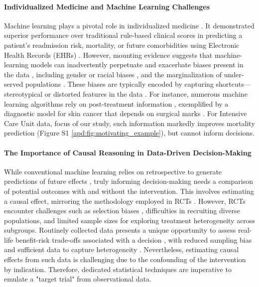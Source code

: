 \documentclass[10pt,letterpaper]{article}
\begin{document}
\paragraph{Individualized Medicine and Machine Learning Challenges}
Machine learning plays a pivotal role in individualized medicine  \cite{rajkomar2018scalable,liu2019comparison,li2020behrt,beaulieu2021machine,aggarwal2021diagnostic}. It
demonstrated superior performance over traditional rule-based clinical scores in predicting a patient's readmission risk, mortality, or future comorbidities using Electronic Health Records (EHRs) \cite{rajkomar2018scalable,liu2019comparison,li2020behrt,beaulieu2021machine,aggarwal2021diagnostic}.
However, mounting evidence suggests that machine-learning models can inadvertently perpetuate and exacerbate biases present in the data \cite{rajkomar2018ensuring}, including gender or racial biases \cite{singh2022generalizability,gichoya2022ai}, and the marginalization of under-served populations \cite{seyyed2021underdiagnosis}. These biases are typically encoded by capturing shortcuts—stereotypical or distorted features in the data \cite{geirhos2020shortcut,winkler2019association,degrave2021ai}.
%
For instance, numerous machine learning algorithms rely on post-treatment information \cite{badgeley2019deep,obermeyer2019dissecting,yuan2021temporal,wong2021external}, exemplified by a diagnostic model for skin cancer that depends on surgical marks \cite{winkler2019association}. For Intensive Care Unit data, focus of our study, such information markedly improves mortality prediction (Figure S1 \ref{apd:fig:motivating_example}), but cannot inform decisions.

\paragraph{The Importance of Causal Reasoning in Data-Driven Decision-Making} \cite{prosperi2020causal}
While conventional machine learning relies on retrospective to generate predictions of future effects \cite{plecko2022causal}, truly informing decision-making needs a comparison of potential outcomes with and without the intervention. This involves estimating a causal effect, mirroring the methodology employed in RCTs \cite{prosperi2020causal}. However, RCTs encounter challenges such as selection biases \cite{travers2007external,averitt2020translating}, difficulties in recruiting diverse populations, and limited sample sizes for exploring treatment heterogeneity across subgroups. Routinely collected data presents a unique opportunity to assess real-life benefit-risk trade-offs associated with a decision \cite{desai2021broadening}, with reduced sampling bias and sufficient data to capture heterogeneity \cite{rekkas2023standardized}. Nevertheless, estimating causal effects from such data is challenging due to the confounding of the intervention by indication. Therefore, dedicated statistical techniques are imperative to emulate a "target trial" \cite{hernan2016specifying} from observational data.
\end{document}
